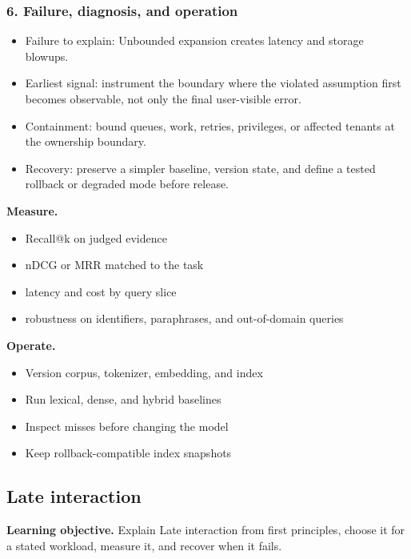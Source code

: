 \subsubsection*{6. Failure, diagnosis, and operation}
\begin{itemize}
\item Failure to explain: Unbounded expansion creates latency and storage blowups.
\item Earliest signal: instrument the boundary where the violated assumption first becomes observable, not only the final user-visible error.
\item Containment: bound queues, work, retries, privileges, or affected tenants at the ownership boundary.
\item Recovery: preserve a simpler baseline, version state, and define a tested rollback or degraded mode before release.
\end{itemize}
\textbf{Measure.}\begin{itemize}
\item Recall@k on judged evidence
\item nDCG or MRR matched to the task
\item latency and cost by query slice
\item robustness on identifiers, paraphrases, and out-of-domain queries
\end{itemize}
\textbf{Operate.}\begin{itemize}
\item Version corpus, tokenizer, embedding, and index
\item Run lexical, dense, and hybrid baselines
\item Inspect misses before changing the model
\item Keep rollback-compatible index snapshots
\end{itemize}
\subsection{Late interaction}
\textbf{Learning objective.} Explain Late interaction from first principles, choose it for a stated workload, measure it, and recover when it fails.
